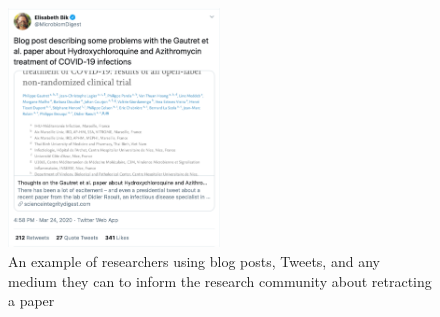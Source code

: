 \documentclass[acmsmall,authordraft]{acmart}
\begin{document}
\begin{figure}
  \includegraphics[width=0.5\textwidth]{Pictures/elisabeth_tweet.png}
  \caption{An example of researchers using blog posts, Tweets, and any medium they can to inform the research community about retracting a paper \citep{Elisabeth2010twitter}}
  \label{Elisabeth_Tweet}
\end{figure}
\end{document}
